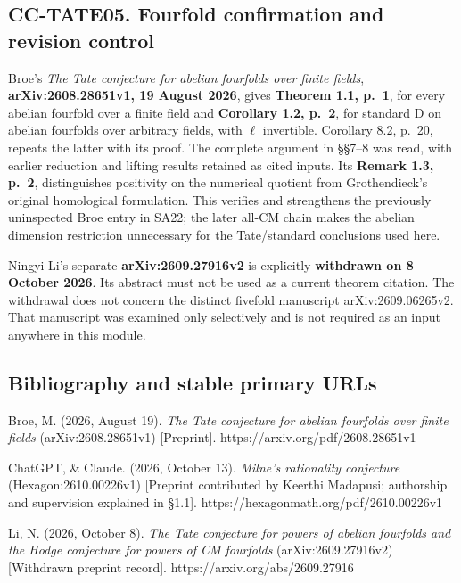 \subsection{CC-TATE05. Fourfold confirmation and revision
control}\label{cc-tate05.-fourfold-confirmation-and-revision-control}

Broe's \emph{The Tate conjecture for abelian fourfolds over finite
fields}, \textbf{arXiv:2608.28651v1, 19 August 2026}, gives
\textbf{Theorem 1.1, p.~1}, for every abelian fourfold over a finite
field and \textbf{Corollary 1.2, p.~2}, for standard D on abelian
fourfolds over arbitrary fields, with \(\ell\) invertible. Corollary
8.2, p.~20, repeats the latter with its proof. The complete argument in
§§7--8 was read, with earlier reduction and lifting results retained as
cited inputs. Its \textbf{Remark 1.3, p.~2}, distinguishes positivity on
the numerical quotient from Grothendieck's original homological
formulation. This verifies and strengthens the previously uninspected
Broe entry in SA22; the later all-CM chain makes the abelian dimension
restriction unnecessary for the Tate/standard conclusions used here.

Ningyi Li's separate \textbf{arXiv:2609.27916v2} is explicitly
\textbf{withdrawn on 8 October 2026}. Its abstract must not be used as a
current theorem citation. The withdrawal does not concern the distinct
fivefold manuscript arXiv:2609.06265v2. That manuscript was examined
only selectively and is not required as an input anywhere in this
module.

\subsection{Bibliography and stable primary
URLs}\label{bibliography-and-stable-primary-urls}

Broe, M. (2026, August 19). \emph{The Tate conjecture for abelian
fourfolds over finite fields} (arXiv:2608.28651v1) {[}Preprint{]}.
https://arxiv.org/pdf/2608.28651v1

ChatGPT, \& Claude. (2026, October 13). \emph{Milne's rationality
conjecture} (Hexagon:2610.00226v1) {[}Preprint contributed by Keerthi
Madapusi; authorship and supervision explained in §1.1{]}.
https://hexagonmath.org/pdf/2610.00226v1

Li, N. (2026, October 8). \emph{The Tate conjecture for powers of
abelian fourfolds and the Hodge conjecture for powers of CM fourfolds}
(arXiv:2609.27916v2) {[}Withdrawn preprint record{]}.
https://arxiv.org/abs/2609.27916

